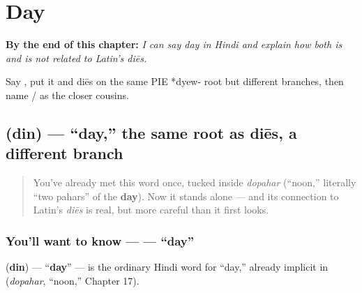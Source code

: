 
\chapter{Day}
\label{ch:hi-day}

\begin{chapteropening}
\textbf{By the end of this chapter:} \emph{I can say day in Hindi and explain how  both is and is not related to Latin's diēs.}

Say , put it and diēs on the same PIE *dyew- root but different branches, then name / as the closer cousins.
\end{chapteropening}

\section[\texorpdfstring{\hi{दिन} (din)}{दिन (din)}]{ (din) — \textquotedblleft{}day,\textquotedblright{} the same root as diēs, a different branch}

\label{lesson:HI-C25-din}



\begin{quote}
You've already met this word once, tucked inside \emph{dopahar} (\textquotedblleft{}noon,\textquotedblright{} literally \textquotedblleft{}two pahars\textquotedblright{} of the \textbf{day}). Now it stands alone — and its connection to Latin's \emph{diēs} is real, but more careful than it first looks.
\end{quote}

\subsection*{You'll want to know —  — \textquotedblleft{}day\textquotedblright{}}
\textbf{} (\textbf{din}) — \textquotedblleft{}\textbf{day}\textquotedblright{} — is the ordinary Hindi word for \textquotedblleft{}day,\textquotedblright{} already implicit in \textbf{} (\emph{dopahar}, \textquotedblleft{}noon,\textquotedblright{} Chapter 17).


